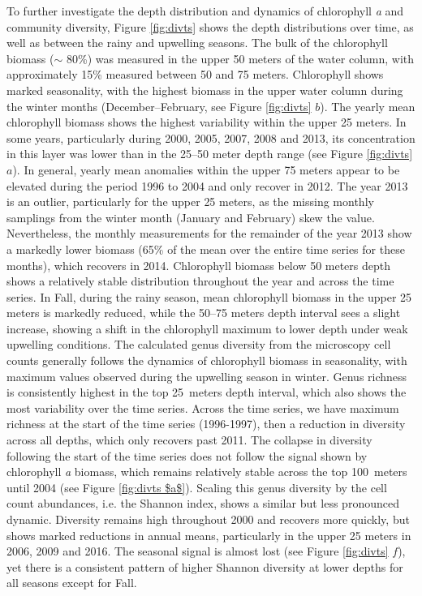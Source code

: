 \documentclass[draft]{agujournal2019}
\begin{document}
To further investigate the depth distribution and dynamics of chlorophyll \textit{a} and community diversity, Figure \ref{fig:divts} shows the depth distributions over time, as well as between the rainy and upwelling seasons. The bulk of the chlorophyll biomass ($\sim$ 80\%) was measured in the upper 50 meters of the water column, with approximately 15\% measured between 50 and 75 meters. Chlorophyll shows marked seasonality, with the highest biomass in the upper water column during the winter months (December–February, see Figure \ref{fig:divts} $b$). The yearly mean chlorophyll biomass shows the highest variability within the upper 25 meters. In some years, particularly during 2000, 2005, 2007, 2008 and 2013, its concentration in this layer was lower than in the 25–50 meter depth range (see Figure \ref{fig:divts} $a$). In general, yearly mean anomalies within the upper 75 meters appear to be elevated during the period 1996 to 2004 and only recover in 2012. The year 2013 is an outlier, particularly for the upper 25 meters, as the missing monthly samplings from the winter month (January and February) skew the value. Nevertheless, the monthly measurements for the remainder of the year 2013 show a markedly lower biomass (65\% of the mean over the entire time series for these months), which recovers in 2014. Chlorophyll biomass below 50 meters depth shows a relatively stable distribution throughout the year and across the time series. In Fall, during the rainy season, mean chlorophyll biomass in the upper 25 meters is markedly reduced, while the 50–75 meters depth interval sees a slight increase, showing a shift in the chlorophyll maximum to lower depth under weak upwelling conditions.
The calculated genus diversity from the microscopy cell counts generally follows the dynamics of chlorophyll biomass in seasonality, with maximum values observed during the upwelling season in winter. Genus richness is consistently highest in the top \qty{25}{meters} depth interval, which also shows the most variability over the time series. Across the time series, we have maximum richness at the start of the time series (1996-1997), then a reduction in diversity across all depths, which only recovers past 2011. The collapse in diversity following the start of the time series does not follow the signal shown by chlorophyll \textit{a} biomass, which remains relatively stable across the top \qty{100}{meters} until 2004 (see Figure \ref{fig:divts $a$}). Scaling this genus diversity by the cell count abundances, i.e. the Shannon index, shows a similar but less pronounced dynamic. Diversity remains high throughout 2000 and recovers more quickly, but shows marked reductions in annual means, particularly in the upper 25 meters in 2006, 2009 and 2016. The seasonal signal is almost lost (see Figure \ref{fig:divts} $f$), yet there is a consistent pattern of higher Shannon diversity at lower depths for all seasons except for Fall. 
\end{document}

